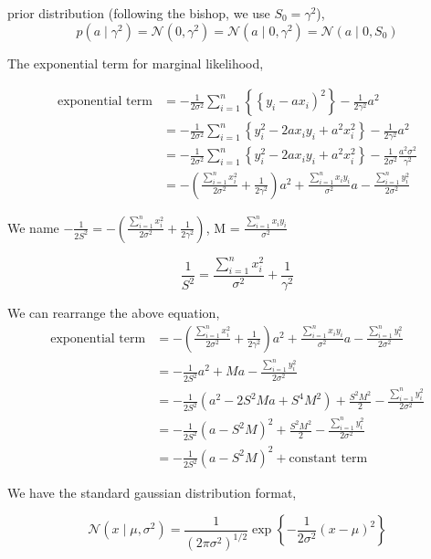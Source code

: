 \documentclass[11pt]{article}
\begin{document}
\begin{enumerate}
\begin{enumerate}[label=(\alph*)]
prior distribution (following the bishop, we use $S_0=\gamma^2$),
$$p({a} \mid \gamma^2) = \mathcal{N}(0,\gamma^2) = \mathcal{N}\left(a \mid 0, \gamma^2\right) = \mathcal{N}\left(a \mid 0, S_0\right)$$



The exponential term for marginal likelihood,

$$
\begin{aligned}
\text{exponential term}
&= -\frac{1}{2\sigma^2} \sum_{i=1}^{n}\left\{\left\{y_{i}-a x_{i}\right)^{2}\right\} - \frac{1}{2\gamma^2}a^2\\
&= -\frac{1}{2\sigma^2} \sum_{i=1}^{n}\left\{y_{i}^2-2 a x_{i} y_{i} + a^2 x_i ^2\right\} - \frac{1}{2\gamma^2}a^2\\
&= -\frac{1}{2\sigma^2} \sum_{i=1}^{n}\left\{y_{i}^2-2 a x_{i} y_{i} + a^2 x_i ^2\right\} - \frac{1}{2\sigma^2} \frac{a^2 \sigma^2}{\gamma^2} \\
&= -(\frac{\sum_{i=1}^{n}{x_i^2}}{2\sigma^2} + \frac{1}{2\gamma^2})a^2 + \frac{\sum_{i=1}^{n} x_i y_i}{\sigma^2} a - \frac{\sum_{i=1}^{n}{y_i^2}}{2\sigma^2}
\end{aligned}
$$


We name $ -\frac{1}{2S^2}  =  -( \frac{\sum_{i=1}^{n}{x_i^2}}{2\sigma^2} + \frac{1}{2\gamma^2}) $, M = $\frac{\sum_{i=1}^{n} x_i y_i}{\sigma^2}$


$$
\frac{1}{S^2} =  \frac{\sum_{i=1}^{n}{x_i^2}}{\sigma^2} + \frac{1}{\gamma^2}
$$

We can rearrange the above equation,
$$
\begin{aligned}
\text{exponential term}
&= -(\frac{\sum_{i=1}^{n}{x_i^2}}{2\sigma^2} + \frac{1}{2\gamma^2})a^2 + \frac{\sum_{i=1}^{n} x_i y_i}{\sigma^2} a - \frac{\sum_{i=1}^{n}{y_i^2}}{2\sigma^2}\\
&= -\frac{1}{2S^2} a^2 + M a - \frac{\sum_{i=1}^{n}{y_i^2}}{2\sigma^2} \\
&= -\frac{1}{2S^2} (a^2 - 2S^2Ma + S^4M^2) + \frac{S^2M^2}{2} - \frac{\sum_{i=1}^{n}{y_i^2}}{2\sigma^2} \\
&= -\frac{1}{2S^2} (a-S^2M)^2 + \frac{S^2M^2}{2} - \frac{\sum_{i=1}^{n}{y_i^2}}{2\sigma^2} \\
&= -\frac{1}{2S^2} (a-S^2M)^2 + \text{constant term}
\end{aligned}
$$


We have the standard gaussian distribution format,

$$\mathcal{N}\left(x \mid \mu, \sigma^{2}\right)=\frac{1}{\left(2 \pi \sigma^{2}\right)^{1 / 2}} \exp \left\{-\frac{1}{2 \sigma^{2}}(x-\mu)^{2}\right\}$$


\end{enumerate}
\end{enumerate}
\end{document}
